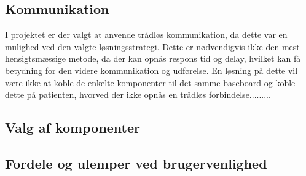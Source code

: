 \subsection{Kommunikation}
I projektet er der valgt at anvende trådløs kommunikation, da dette var en mulighed ved den valgte løsningsstrategi. Dette er nødvendigvis ikke den mest hensigtsmæssige metode, da der kan opnås respons tid og delay, hvilket kan få betydning for den videre kommunikation og udførelse. En løsning på dette vil være ikke at koble de enkelte komponenter til det samme baseboard og koble dette på patienten, hvorved der ikke opnås en trådløs forbindelse.........


\subsection{Valg af komponenter}


\subsection{Fordele og ulemper ved brugervenlighed}

